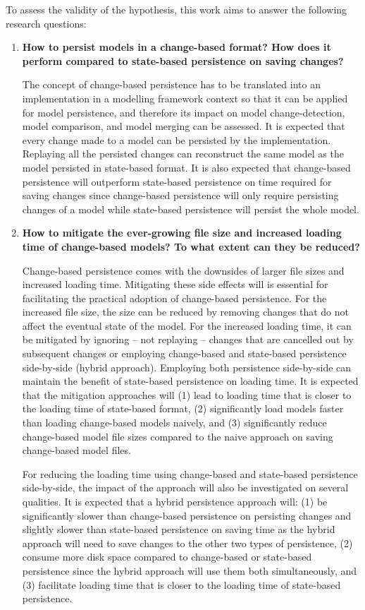\documentclass[12pt, a4paper]{report} \usepackage[titletoc]{appendix}
\begin{document}
To assess the validity of the hypothesis, this work aims to answer the following research questions: 
\begin{enumerate} 
\item \textbf{How to persist models in a change-based format? How does it perform compared to state-based persistence on saving changes?} 

The concept of change-based persistence has to be translated into an implementation in a modelling framework context so that it can be applied for model persistence, and therefore its impact on model change-detection, model comparison, and model merging can be assessed. It is expected that every change made to a model can be persisted by the implementation. Replaying all the persisted changes can reconstruct the same model as the model persisted in state-based format. It is also expected that change-based persistence will outperform state-based persistence on time required for saving changes since change-based persistence will only require persisting changes of a model while state-based persistence will persist the whole model. 

\item \textbf{How to mitigate the ever-growing file size and increased loading time of change-based models? To what extent can they be reduced?} 

Change-based persistence comes with the downsides of larger file sizes and increased loading time. Mitigating these side effects will is essential for facilitating the practical adoption of change-based persistence. For the increased file size, the size can be reduced by removing changes that do not affect the eventual state of the model. For the increased loading time, it can be mitigated by ignoring -- not replaying -- changes that are cancelled out by subsequent changes or employing change-based and state-based persistence side-by-side (hybrid approach). Employing both persistence side-by-side can maintain the benefit of state-based persistence on loading time. It is expected that the mitigation approaches will (1) lead to loading time that is closer to the loading time of state-based format, (2) significantly load models faster than loading change-based models naively, and (3) significantly reduce change-based model file sizes compared to the naive approach on saving change-based model files. 

For reducing the loading time using change-based and state-based persistence side-by-side, the impact of the approach will also be investigated on several qualities. It is expected that a hybrid persistence approach will: (1) be significantly slower than change-based persistence on persisting changes and slightly slower than state-based persistence on saving time as the hybrid approach will need to save changes to the other two types of persistence, (2) consume more disk space compared to change-based or state-based persistence since the hybrid approach will use them both simultaneously, and (3) facilitate loading time that is closer to the loading time of state-based persistence. 


\end{enumerate}
\end{document}
